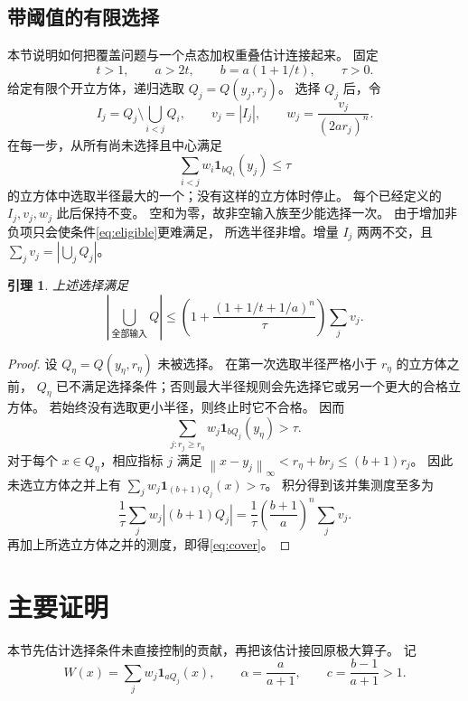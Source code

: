\documentclass[UTF8,a4paper,11pt,fontset=fandol]{ctexart}
\newtheorem{lemma}{引理}[section]
\theoremstyle{remark}
\newcommand{\one}{\mathbf 1}
\newcommand{\norm}[1]{\left\lVert#1\right\rVert}
\begin{document}
\subsection{带阈值的有限选择}
本节说明如何把覆盖问题与一个点态加权重叠估计连接起来。
固定
\begin{equation}\label{eq:parameters}
 t>1,\qquad a>2t,\qquad b=a(1+1/t),\qquad \tau>0.
\end{equation}
给定有限个开立方体，递归选取 $Q_j=Q(y_j,r_j)$。
选择 $Q_j$ 后，令
\begin{equation}\label{eq:increments}
 I_j=Q_j\setminus\bigcup_{i<j}Q_i,\qquad
 v_j=|I_j|,\qquad w_j=\frac{v_j}{(2ar_j)^n}.
\end{equation}
在每一步，从所有尚未选择且中心满足
\begin{equation}\label{eq:eligible}
 \sum_{i<j}w_i\one_{bQ_i}(y_j)\le\tau
\end{equation}
的立方体中选取半径最大的一个；没有这样的立方体时停止。
每个已经定义的 $I_j,v_j,w_j$ 此后保持不变。
空和为零，故非空输入族至少能选择一次。
由于增加非负项只会使条件\eqref{eq:eligible}更难满足，
所选半径非增。增量 $I_j$ 两两不交，且
$\sum_j v_j=|\bigcup_j Q_j|$。

\begin{lemma}\label{lem:cover}
上述选择满足
\begin{equation}\label{eq:cover}
 \left|\bigcup_{\text{全部输入}}Q\right|
 \le \left(1+\frac{(1+1/t+1/a)^n}{\tau}\right)\sum_jv_j.
\end{equation}
\end{lemma}
\begin{proof}
设 $Q_\eta=Q(y_\eta,r_\eta)$ 未被选择。
在第一次选取半径严格小于 $r_\eta$ 的立方体之前，
$Q_\eta$ 已不满足选择条件；否则最大半径规则会先选择它或另一个更大的合格立方体。
若始终没有选取更小半径，则终止时它不合格。
因而
\[
 \sum_{j:r_j\ge r_\eta}w_j\one_{bQ_j}(y_\eta)>\tau.
\]
对于每个 $x\in Q_\eta$，相应指标 $j$ 满足
$\norm{x-y_j}_\infty<r_\eta+br_j\le(b+1)r_j$。
因此未选立方体之并上有
$\sum_jw_j\one_{(b+1)Q_j}(x)>\tau$。
积分得到该并集测度至多为
\[
 \frac1\tau\sum_jw_j|(b+1)Q_j|
 =\frac1\tau\left(\frac{b+1}{a}\right)^n\sum_jv_j .
\]
再加上所选立方体之并的测度，即得\eqref{eq:cover}。
\end{proof}

\section{主要证明}
本节先估计选择条件未直接控制的贡献，再把该估计接回原极大算子。
记
\[
 W(x)=\sum_jw_j\one_{aQ_j}(x),\qquad
 \alpha=\frac{a}{a+1},\qquad c=\frac{b-1}{a+1}>1.
\]
\end{document}
